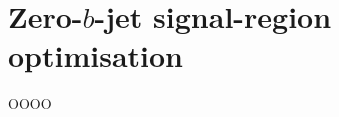 \chapter{Zero-\texorpdfstring{$b$}{b}-jet signal-region optimisation}
\label{app:appendix-3}

OOOO

